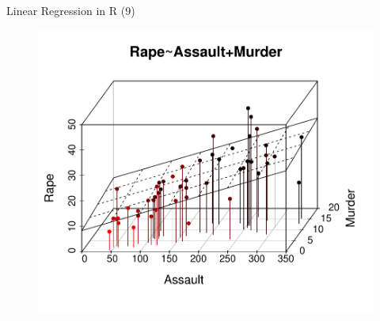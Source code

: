 \documentclass[handout]{beamer}
\begin{document}
\begin{frame}{Linear Regression in R (9)}
 
\begin{figure}[h!]
	\centering
	\includegraphics[scale=0.6]{pics/reg3d.pdf}
\end{figure}
 
\end{frame}
\end{document}

